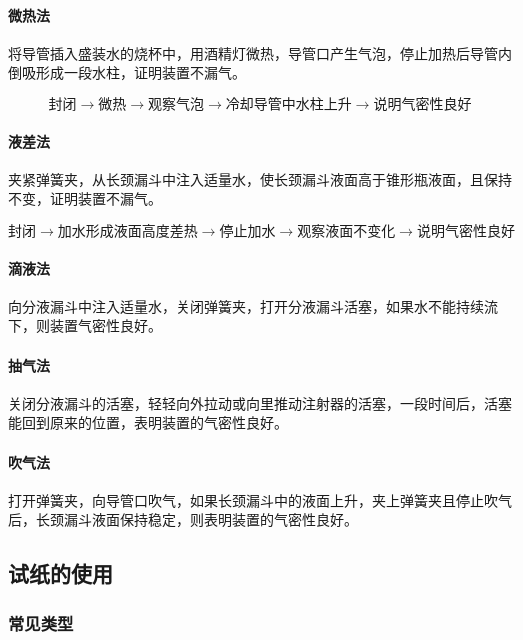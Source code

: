 \documentclass[10pt]{article}
\begin{document}
	\paragraph{微热法}
	
	将导管插入盛装水的烧杯中，用酒精灯微热，导管口产生气泡，停止加热后导管内倒吸形成一段水柱，证明装置不漏气。
	
	$$
	\text{封闭}\rightarrow\text{微热}\rightarrow\text{观察气泡}\rightarrow\text{冷却导管中水柱上升}\rightarrow\text{说明气密性良好}
	$$
	
	\paragraph{液差法}
	
	夹紧弹簧夹，从长颈漏斗中注入适量水，使长颈漏斗液面高于锥形瓶液面，且保持不变，证明装置不漏气。
	
	$$
	\text{封闭}\rightarrow\text{加水形成液面高度差热}\rightarrow\text{停止加水}\rightarrow\text{观察液面不变化}\rightarrow\text{说明气密性良好}
	$$
	
	\paragraph{滴液法}
	
	向分液漏斗中注入适量水，关闭弹簧夹，打开分液漏斗活塞，如果水不能持续流下，则装置气密性良好。
	
	\paragraph{抽气法}
	
	关闭分液漏斗的活塞，轻轻向外拉动或向里推动注射器的活塞，一段时间后，活塞能回到原来的位置，表明装置的气密性良好。
	
	\paragraph{吹气法}
	
	打开弹簧夹，向导管口吹气，如果长颈漏斗中的液面上升，夹上弹簧夹且停止吹气后，长颈漏斗液面保持稳定，则表明装置的气密性良好。
	
	
	\subsection{试纸的使用}
	
	\subsubsection{常见类型}
	
\end{document}
